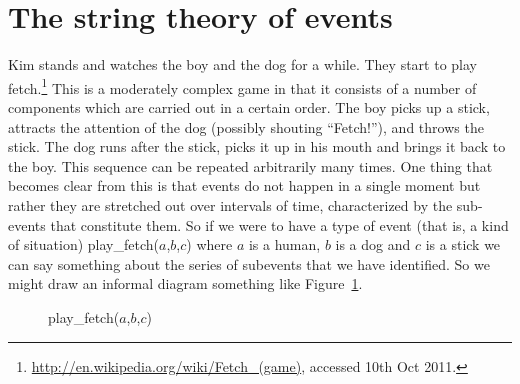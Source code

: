 
\section{The string theory of events}
\label{sec:ev-strings}

Kim stands and watches the boy and the dog for a while.  They start to
play fetch.\footnote{\url{http://en.wikipedia.org/wiki/Fetch_(game)},
  accessed 10th Oct 2011.}  This is a moderately complex game in that
it consists of a number of components which are carried out in a
certain order.  The boy picks up a stick, attracts the attention of
the dog (possibly shouting ``Fetch!''), and throws the stick.  The dog
runs after the stick, picks it up in his mouth and brings it back to
the boy.  This sequence can be repeated arbitrarily many times.  One
thing that becomes clear from this is that events do not happen in a
single moment but rather they are stretched out over intervals of
time, characterized by the sub-events that constitute them.  So if we were to have a type of event (that is, a kind of situation)
play\_fetch($a$,$b$,$c$) where $a$ is a human, $b$ is a dog and
$c$ is a stick%
we can %
say something about the series of subevents that we have identified.
So we might draw an informal diagram something like
Figure~\ref{fig:fetch}.
\begin{figure} 


\hspace*{-4em}


\caption{play\_fetch($a$,$b$,$c$)}
\label{fig:fetch}
\end{figure}




